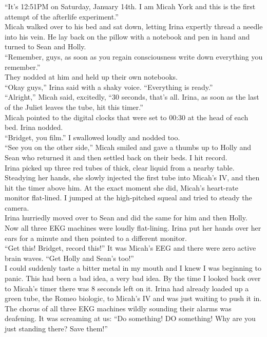 \documentclass[a5paper]{scrartcl}
\begin{document}
“It's 12:51PM on Saturday, January 14th. I am Micah York and this is the first attempt of the afterlife experiment.”\\
Micah walked over to his bed and sat down, letting Irina expertly thread a needle into his vein. He lay back on the pillow with a notebook and pen in hand and turned to Sean and Holly.\\
\enquote{Remember, guys, as soon as you regain consciousness write down everything you remember.}\\
They nodded at him and held up their own notebooks.\\
\enquote{Okay guys,} Irina said with a shaky voice. \enquote{Everything is ready.}\\
\enquote{Alright,” Micah said, excitedly, “30 seconds, that's all. Irina, as soon as the last of the Juliet leaves the tube, hit this timer.}\\
Micah pointed to the digital clocks that were set to 00:30 at the head of each bed. Irina nodded.\\
\enquote{Bridget, you film.} I swallowed loudly and nodded too.\\
\enquote{See you on the other side,} Micah smiled and gave a thumbs up to Holly and Sean who returned it and then settled back on their beds. I hit record.\\
Irina picked up three red tubes of thick, clear liquid from a nearby table. Steadying her hands, she slowly injected the first tube into Micah's IV, and then hit the timer above him. At the exact moment she did, Micah's heart-rate monitor flat-lined. I jumped at the high-pitched squeal and tried to steady the camera.\\
Irina hurriedly moved over to Sean and did the same for him and then Holly. Now all three EKG machines were loudly flat-lining. Irina put her hands over her ears for a minute and then pointed to a different monitor.\\
\enquote{Get this! Bridget, record this!} It was Micah's EEG and there were zero active brain waves. \enquote{Get Holly and Sean's too!}\\
I could suddenly taste a bitter metal in my mouth and I knew I was beginning to panic. This had been a bad idea, a very bad idea. By the time I looked back over to Micah's timer there was 8 seconds left on it. Irina had already loaded up a green tube, the Romeo biologic, to Micah's IV and was just waiting to push it in.\\
The chorus of all three EKG machines wildly sounding their alarms was deafening. It was screaming at us: “Do something! DO something! Why are you just standing there? Save them!”\\
\end{document}
